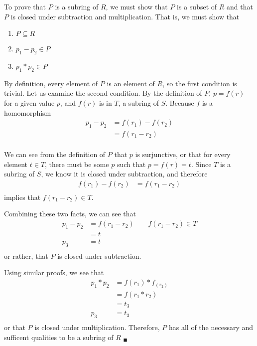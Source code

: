 \documentclass{article}
\begin{document}
\begin{enumerate}
			To prove that $P$ is a subring of $R$, we must show that $P$ is a subset of $R$ and that
			$P$ is closed under subtraction and multiplication. That is, we must show that

			\begin{enumerate}
				\item $P \subseteq R$
				\item $p_1 - p_2 \in P$
				\item $p_1 * p_2 \in P$
			\end{enumerate} 

			By definition, every element of $P$ is an element of $R$, so the first condition is 
			trivial. Let us examine the second condition. By the definition of $P$, $p = f(r)$ for
			a given value $p$, and $f(r)$ is in $T$, a subring of $S$. Because $f$ is a homomorphism
			\begin{align*}
				p_1 - p_2 & = f(r_1) - f(r_2)\\
						  & = f(r_1 - r_2) \\
			\end{align*}

			We can see from the definition of $P$ that $p$ is surjunctive, or that for every 
			element $t \in T$, there must be some $p$ such that $p = f(r) = t$. Since $T$ is a 
			subring of $S$, we know it is closed under subtraction, and therefore
			\begin{align*}
				f(r_1) - f(r_2) & = f(r_1 - r_2) \\
			\end{align*}
			implies that $f(r_1 - r_2) \in T$. 

			Combining these two facts, we can see that
			\begin{align*}
				p_1 - p_2 & = f(r_1 - r_2) \qquad f(r_1 - r_2) \in T \\
					      & = t \\
					  p_3 & = t \\
			\end{align*}
			or rather, that $P$ is closed under subtraction.

			Using similar proofs, we see that 
			\begin{align*}
				p_1 * p_2 & = f(r_1) * f_(r_2) \\
						  & = f(r_1 * r_2) \\
						  & = t_3 \\
					  p_3 & = t_3 \\
			\end{align*}
			or that $P$ is closed under multiplication. Therefore, $P$ has all of the necessary and 
			sufficent qualities to be a subring of $R$ $_{\blacksquare}$

	\end{enumerate}
\end{document}
